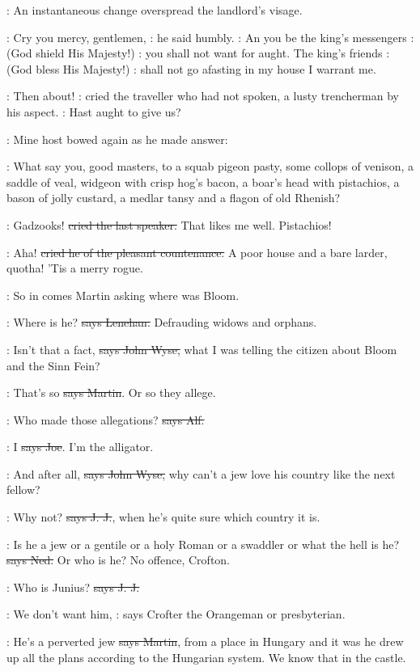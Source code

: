 :
An instantaneous change overspread the landlord's visage.

\terry:
Cry you mercy, gentlemen,
:
he said humbly.
\terry:
An you be the king's messengers
:
(God shield His Majesty!)
\terry:
you shall not want for aught. The king's friends
:
(God bless His Majesty!)
\terry:
shall not go afasting in my house I warrant me.

\crofton:
Then about!
:
cried the traveller who had not spoken,
a lusty trencherman by his aspect.
\crofton:
Hast aught to give us?

:
Mine host bowed again as he made answer:

\terry:
What say you, good masters,
to a squab pigeon pasty, some collops of
venison, a saddle of veal, widgeon with crisp hog's bacon, a boar's head
with pistachios, a bason of jolly custard, a medlar tansy and a flagon of
old Rhenish?

\crofton:
Gadzooks! \sout{cried the last speaker.}
That likes me well. Pistachios!

\power:
Aha! \sout{cried he of the pleasant countenance.}
A poor house and a bare
larder, quotha! 'Tis a merry rogue.

\Nq:
So in comes Martin asking where was Bloom.

\lenehan:
Where is he? \sout{says Lenehan.}
Defrauding widows and orphans.

\johnwyse:
Isn't that a fact, \sout{says John Wyse,}
what I was telling the citizen about
Bloom and the Sinn Fein?

\cunningham:
That's so \sout{says Martin}.
Or so they allege.

\bergan:
Who made those allegations? \sout{says Alf.}

\joe:
I \sout{says Joe}. I'm the alligator.

\johnwyse:
And after all, \sout{says John Wyse,}
why can't a jew love his country like the
next fellow?

\jjom:
Why not? \sout{says J. J.},
when he's quite sure which country it is.

\lambert:
Is he a jew or a gentile or a holy Roman
or a swaddler or what the hell
is he? \sout{says Ned.} Or who is he? No offence, Crofton.

\jjom:
Who is Junius? \sout{says J. J.}

\crofton:
We don't want him,
\Nq:
says Crofter the Orangeman or presbyterian.

\cunningham:
He's a perverted jew \sout{says Martin},
from a place in Hungary and it was he
drew up all the plans according to the Hungarian system. We know that in
the castle.

